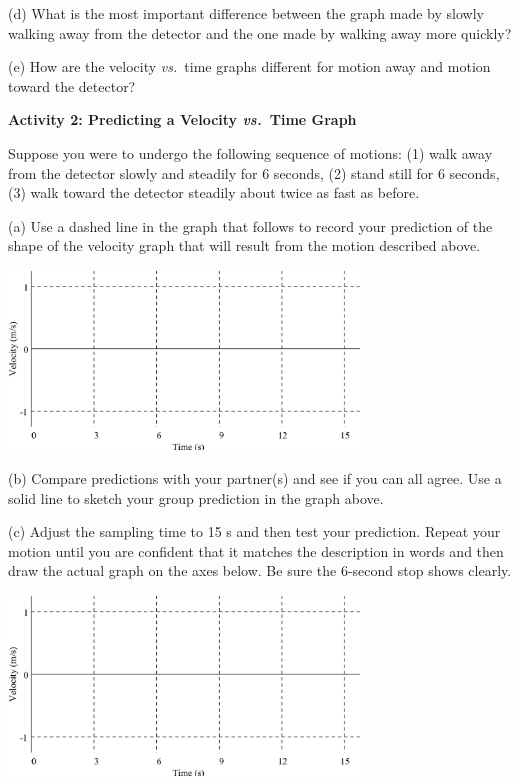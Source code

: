 (d) What is the most important difference between the graph made by slowly walking
away from the detector and the one made by walking away more quickly? 
\answerspace{25mm}

(e) How are the velocity \textit{vs.}~time graphs different for motion away and motion
toward the detector?
\answerspace{25mm}

\pagebreak[2]
\textbf{Activity 2: Predicting a Velocity \textit{vs.}~Time Graph }

Suppose you were to undergo the following sequence of motions: (1) walk away
from the detector slowly and steadily for 6 seconds, (2) stand still for 6 seconds,
(3) walk toward the detector steadily about twice as fast as before.

(a) Use a dashed line in the graph that follows to record your prediction of
the shape of the velocity graph that will result from the motion described above.

\vspace{0.3cm}
{\par\centering \includegraphics[width=0.7\textwidth]{velocity/velocity_fig2.eps} \par}
\vspace{0.3cm}

(b) Compare predictions with your partner(s) and see if you can all agree. Use
a solid line to sketch your group prediction in the graph above.

(c) Adjust the sampling time to 15 s and then test your prediction. Repeat your
motion until you are confident that it matches the description in words and
then draw the actual graph on the axes below. Be sure the 6-second stop shows
clearly.

\vspace{0.3cm}
{\par\centering \includegraphics[width=0.7\textwidth]{velocity/velocity_fig2.eps} \par}
\vspace{0.3cm}

